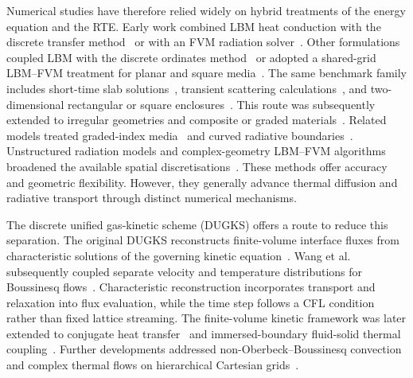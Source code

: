 \documentclass[a4paper,12pt]{ctexart}
\numberwithin{equation}{section}
\begin{document}
Numerical studies have therefore relied widely on hybrid treatments of the energy equation and the RTE. Early work combined LBM heat conduction with the discrete transfer method~\cite{MishraLankadasu2005} or with an FVM radiation solver~\cite{MishraRoy2007}. Other formulations coupled LBM with the discrete ordinates method~\cite{MondalMishra2007} or adopted a shared-grid LBM--FVM treatment for planar and square media~\cite{Sun2016}. The same benchmark family includes short-time slab solutions~\cite{Sutton1986}, transient scattering calculations~\cite{LinTsai1990}, and two-dimensional rectangular or square enclosures~\cite{YuenTakara1988,WuOu1994}. This route was subsequently extended to irregular geometries and composite or graded materials~\cite{Abaszadeh2022,Tong2022}. Related models treated graded-index media~\cite{Wei2023} and curved radiative boundaries~\cite{Sharifi2023}. Unstructured radiation models and complex-geometry LBM--FVM algorithms broadened the available spatial discretisations~\cite{Liu2024,Miao2025}. These methods offer accuracy and geometric flexibility. However, they generally advance thermal diffusion and radiative transport through distinct numerical mechanisms.

The discrete unified gas-kinetic scheme (DUGKS) offers a route to reduce this separation. The original DUGKS reconstructs finite-volume interface fluxes from characteristic solutions of the governing kinetic equation~\cite{Guo2013}. Wang et al. subsequently coupled separate velocity and temperature distributions for Boussinesq flows~\cite{Wang2015}. Characteristic reconstruction incorporates transport and relaxation into flux evaluation, while the time step follows a CFL condition rather than fixed lattice streaming. The finite-volume kinetic framework was later extended to conjugate heat transfer~\cite{Tao2021} and immersed-boundary fluid-solid thermal coupling~\cite{Tao2022}. Further developments addressed non-Oberbeck--Boussinesq convection~\cite{Wen2025} and complex thermal flows on hierarchical Cartesian grids~\cite{Tao2025}.
\end{document}
